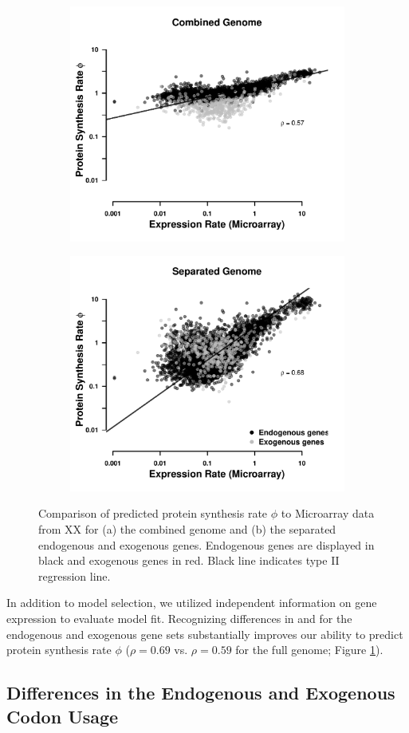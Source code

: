 \documentclass[12pt]{article}
\begin{document}
\begin{figure}[t]
    \centering
    \begin{subfigure}
        \centering
        \includegraphics[width=.45\textwidth]{img/phi_corr_plot_whole_Genome_estim.pdf}
    \end{subfigure}
    \begin{subfigure}
        \centering
        \includegraphics[width=.45\textwidth]{img/phi_corr_plot_split_Genome_estim.pdf}
    \end{subfigure}
    \caption{Comparison of predicted protein synthesis rate $\phi$ to Microarray data from XX for (a) the combined genome and (b) the separated endogenous and exogenous genes. Endogenous genes are displayed in black and exogenous genes in red. Black line indicates type II regression line.}
    \label{fig:phi_corr_two_cond}
\end{figure}

In addition to model selection, we utilized independent information on gene expression to evaluate model fit.
Recognizing differences in \DM and \DE for the endogenous and exogenous gene sets substantially improves our ability to predict protein synthesis rate $\phi$ ($\rho = 0.69$ vs. $\rho = 0.59$ for the full genome;  Figure \ref{fig:phi_corr_two_cond}).

\subsection*{Differences in the Endogenous and Exogenous Codon Usage}
\end{document}
